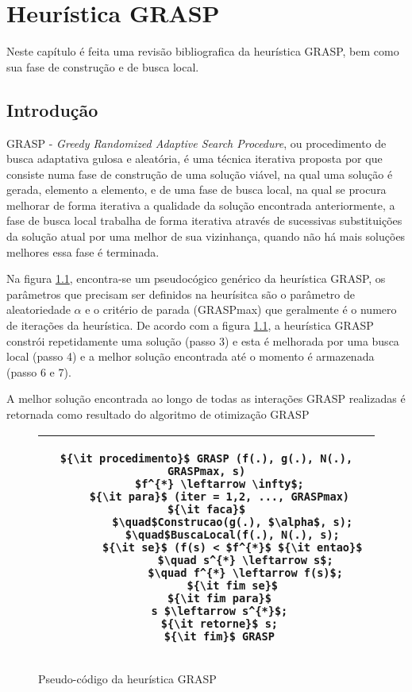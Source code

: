 
\chapter{Heurística GRASP}\label{grasp}
Neste capítulo é feita uma revisão bibliografica da heurística GRASP, bem como sua fase de construção e de busca local.

\section{Introdução}
GRASP - {\it Greedy Randomized Adaptive Search Procedure}, ou procedimento de busca adaptativa gulosa e aleatória, é uma técnica iterativa proposta por  que consiste numa fase de construção de uma solução viável, na qual uma solução é gerada, elemento a elemento, e de uma fase de busca local, na qual se procura melhorar de forma iterativa a qualidade da solução encontrada anteriormente, a fase de busca local trabalha de forma iterativa através de sucessivas substituições da solução atual por uma melhor de sua vizinhança, quando não há mais soluções melhores essa fase é terminada.

Na figura \ref{proc_grasp}, encontra-se um pseudocógico genérico da heurística GRASP, os parâmetros que precisam ser definidos na heurísitca são o parâmetro de aleatoriedade $\alpha$ e o critério de parada (GRASPmax) que geralmente é o numero de iterações da heurística. De acordo com a figura \ref{proc_grasp}, a heurística GRASP constrói repetidamente uma solução (passo 3) e esta é melhorada por uma busca local (passo 4) e a melhor solução encontrada até o momento é armazenada (passo 6 e 7).

A melhor solução encontrada ao longo de todas as interações GRASP realizadas é retornada como resultado do algoritmo de otimização GRASP \cite{SOUZA}


\begin{figure}[H]
    \begin{center}
       \begin{tabular}{c} \hline
        \begin{lstlisting}[mathescape] 
	${\it procedimento}$ GRASP (f(.), g(.), N(.), GRASPmax, s)
	$f^{*} \leftarrow \infty$;
	${\it para}$ (iter = 1,2, ..., GRASPmax) ${\it faca}$
		$\quad$Construcao(g(.), $\alpha$, s);
		$\quad$BuscaLocal(f(.), N(.), s);
		${\it se}$ (f(s) < $f^{*}$ ${\it entao}$
			$\quad s^{*} \leftarrow s$;
			$\quad f^{*} \leftarrow f(s)$;
		${\it fim se}$
	${\it fim para}$
	s $\leftarrow s^{*}$;
	${\it retorne}$ s;
	${\it fim}$ GRASP
	\end{lstlisting}\\
\hline
 \end{tabular}
 \end{center}
\caption{Pseudo-código da heurística GRASP}
\label{proc_grasp}
 \end{figure}

